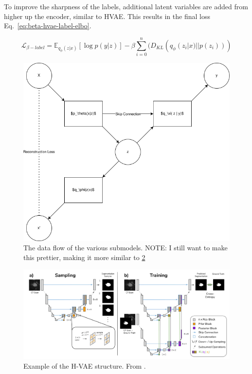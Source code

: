 To improve the sharpness of the labels, additional latent variables are added from higher up the encoder, similar to HVAE. This results in the final loss Eq.~\ref{eq:beta-hvae-label-elbo}.

\begin{equation}
    \label{eq:beta-hvae-label-elbo}
    \mathcal{L}_{\beta-label} = \mathbb{E}_{q_{\phi}(z|x)}[\log p(y|z)] - \beta \sum_{i=0}^n(D_{KL}(q_{\phi}(z_i|x) || p(z_i)))
\end{equation}

\begin{figure}[h]
    \begin{minipage}{0.9\textwidth}
        \includegraphics[width=1\textwidth]{figures/model_data_flow.png}
        \caption{The data flow of the various submodels. NOTE: I still want to make this prettier, making it more similar to \ref{fig:hvae-example}}
        \label{fig:seg-vae-schematic}
    \end{minipage}
\end{figure}

\begin{figure}
    \begin{minipage}{0.9\textwidth}
        \includegraphics[width=1\textwidth]{figures/h_vae_structure.png}
        \caption{Example of the H-VAE structure. From \cite{kohl2018probabilistic}.}
        \label{fig:hvae-example}
    \end{minipage}
\end{figure}

